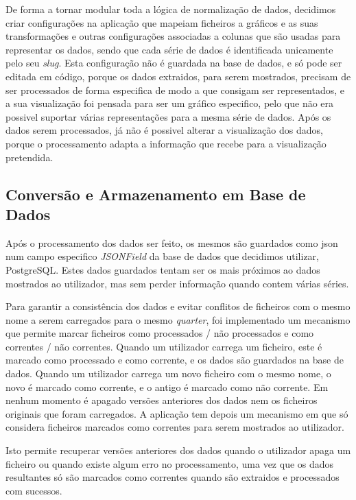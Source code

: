 De forma a tornar modular toda a lógica de normalização de dados, decidimos criar configurações na aplicação que mapeiam ficheiros a gráficos e as suas transformações e outras configurações associadas a colunas que são usadas para representar os dados, sendo que cada série de dados é identificada unicamente pelo seu \textit{slug}. Esta configuração não é guardada na base de dados, e só pode ser editada em código, porque os dados extraidos, para serem mostrados, precisam de ser processados de forma especifica de modo a que consigam ser representados, e a sua visualização foi pensada para ser um gráfico especifico, pelo que não era possivel suportar várias representações para a mesma série de dados. Após os dados serem processados, já não é possivel alterar a visualização dos dados, porque o processamento adapta a informação que recebe para a visualização pretendida.

\subsection{Conversão e Armazenamento em Base de Dados}
\label{sec:armazenamentoDados}

Após o processamento dos dados ser feito, os mesmos são guardados como \gls{json} num campo especifico \textit{JSONField} da base de dados que decidimos utilizar, PostgreSQL. Estes dados guardados tentam ser os mais próximos ao dados mostrados ao utilizador, mas sem perder informação quando contem várias séries.

Para garantir a consistência dos dados e evitar conflitos de ficheiros com o mesmo nome a serem carregados para o mesmo \textit{quarter}, foi implementado um mecanismo que permite marcar ficheiros como processados / não processados e como correntes / não correntes. Quando um utilizador carrega um ficheiro, este é marcado como processado e como corrente, e os dados são guardados na base de dados. Quando um utilizador carrega um novo ficheiro com o mesmo nome, o novo é marcado como corrente, e o antigo é marcado como não corrente. Em nenhum momento é apagado versões anteriores dos dados nem os ficheiros originais que foram carregados. A aplicação tem depois um mecanismo em que só considera ficheiros marcados como correntes para serem mostrados ao utilizador.

Isto permite recuperar versões anteriores dos dados quando o utilizador apaga um ficheiro ou quando existe algum erro no processamento, uma vez que os dados resultantes só são marcados como correntes quando são extraidos e processados com sucessos.


